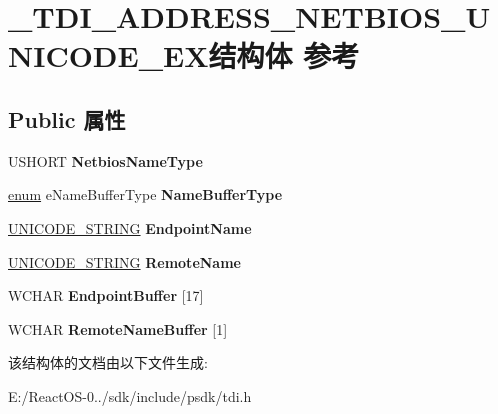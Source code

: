 \hypertarget{struct___t_d_i___a_d_d_r_e_s_s___n_e_t_b_i_o_s___u_n_i_c_o_d_e___e_x}{}\section{\+\_\+\+T\+D\+I\+\_\+\+A\+D\+D\+R\+E\+S\+S\+\_\+\+N\+E\+T\+B\+I\+O\+S\+\_\+\+U\+N\+I\+C\+O\+D\+E\+\_\+\+E\+X结构体 参考}
\label{struct___t_d_i___a_d_d_r_e_s_s___n_e_t_b_i_o_s___u_n_i_c_o_d_e___e_x}
\subsection*{Public 属性}
\begin{DoxyCompactItemize}
\item 
\mbox{\label{struct___t_d_i___a_d_d_r_e_s_s___n_e_t_b_i_o_s___u_n_i_c_o_d_e___e_x_ac2f7dba240e676caca922c9b53067f2e}} 
U\+S\+H\+O\+RT {\bfseries Netbios\+Name\+Type}
\item 
\mbox{\label{struct___t_d_i___a_d_d_r_e_s_s___n_e_t_b_i_o_s___u_n_i_c_o_d_e___e_x_a6e79b036303a2c9ba2d7feeeec3ffb90}} 
\hyperlink{interfaceenum}{enum} e\+Name\+Buffer\+Type {\bfseries Name\+Buffer\+Type}
\item 
\mbox{\label{struct___t_d_i___a_d_d_r_e_s_s___n_e_t_b_i_o_s___u_n_i_c_o_d_e___e_x_a2994ba20542cc02f241eea94c129437b}} 
\hyperlink{struct___u_n_i_c_o_d_e___s_t_r_i_n_g}{U\+N\+I\+C\+O\+D\+E\+\_\+\+S\+T\+R\+I\+NG} {\bfseries Endpoint\+Name}
\item 
\mbox{\label{struct___t_d_i___a_d_d_r_e_s_s___n_e_t_b_i_o_s___u_n_i_c_o_d_e___e_x_a9e0f8a987f5fbd0c33dbb1a34c0b5626}} 
\hyperlink{struct___u_n_i_c_o_d_e___s_t_r_i_n_g}{U\+N\+I\+C\+O\+D\+E\+\_\+\+S\+T\+R\+I\+NG} {\bfseries Remote\+Name}
\item 
\mbox{\label{struct___t_d_i___a_d_d_r_e_s_s___n_e_t_b_i_o_s___u_n_i_c_o_d_e___e_x_a8b10d71856f140f0b0fb47ea78844336}} 
W\+C\+H\+AR {\bfseries Endpoint\+Buffer} \mbox{[}17\mbox{]}
\item 
\mbox{\label{struct___t_d_i___a_d_d_r_e_s_s___n_e_t_b_i_o_s___u_n_i_c_o_d_e___e_x_aed79198c771e984f7f3aeb00b82fb3a8}} 
W\+C\+H\+AR {\bfseries Remote\+Name\+Buffer} \mbox{[}1\mbox{]}
\end{DoxyCompactItemize}


该结构体的文档由以下文件生成\+:\begin{DoxyCompactItemize}
\item 
E\+:/\+React\+O\+S-\/0../sdk/include/psdk/tdi.\+h\end{DoxyCompactItemize}
